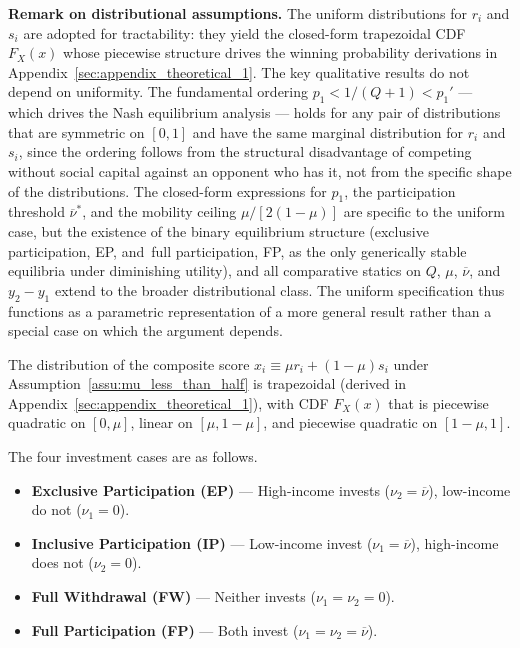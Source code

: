 \documentclass[
    oneside,
    fontsize=10pt,leqno]{article}
\begin{document}
\noindent\textbf{Remark on distributional assumptions.}
The uniform distributions for $r_i$ and $s_i$ are adopted for
tractability: they yield the closed-form trapezoidal CDF
$F_X(x)$ whose piecewise structure drives the winning probability
derivations in Appendix~\ref{sec:appendix_theoretical_1}. The
key qualitative results do not depend on uniformity. The
fundamental ordering $p_1 < 1/(Q+1) < p_1'$ --- which drives the
Nash equilibrium analysis --- holds for any pair of distributions
that are symmetric on $[0,1]$ and have the same marginal
distribution for $r_i$ and $s_i$, since the ordering follows from
the structural disadvantage of competing without social capital
against an opponent who has it, not from the specific shape of the
distributions. The closed-form expressions for $p_1$, the
participation threshold $\overline{\nu}^*$, and the mobility
ceiling $\mu/[2(1-\mu)]$ are specific to the uniform case, but
the existence of the binary equilibrium structure (exclusive participation, EP, and~full participation, FP,
as the only generically stable equilibria under diminishing
utility), and all comparative statics on $Q$, $\mu$, $\overline{\nu}$,
and $y_2 - y_1$ extend to the broader distributional class. The
uniform specification thus functions as a parametric
representation of a more general result rather than a special
case on which the argument depends.

\medskip
\noindent The distribution of the composite score $x_{i}\equiv\mu
r_{i}+(1-\mu)s_{i}$ under Assumption~\ref{assu:mu_less_than_half}
is trapezoidal (derived in Appendix~\ref{sec:appendix_theoretical_1}),
with CDF $F_{X}(x)$ that is piecewise quadratic on $[0,\mu]$, linear
on $[\mu,1-\mu]$, and piecewise quadratic on $[1-\mu,1]$.

The four investment cases are as follows.

\begin{itemize}
\item \textbf{Exclusive Participation (EP)} --- High-income invests ($\nu_{2}=\overline{\nu}$), low-income
do not ($\nu_{1}=0$).
\item \textbf{Inclusive Participation (IP)} --- Low-income invest ($\nu_{1}=\overline{\nu}$), high-income
does not ($\nu_{2}=0$).
\item \textbf{Full Withdrawal (FW)} --- Neither invests ($\nu_{1}=\nu_{2}=0$).
\item \textbf{Full Participation (FP)} --- Both invest ($\nu_{1}=\nu_{2}=\overline{\nu}$).
\end{itemize}
\end{document}
